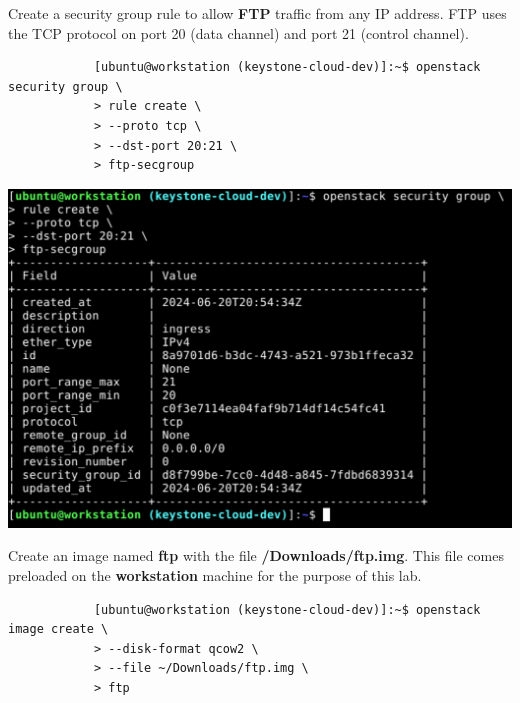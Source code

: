 \documentclass[letterpaper, 12pt]{article}
\begin{document}
\begin{enumerate}
    \begin{labstep}
        Create a security group rule to allow \textbf{FTP} traffic from any IP address.
        FTP uses the TCP protocol on port 20 (data channel) and port 21 (control channel).
        \begin{lstlisting}
            [ubuntu@workstation (keystone-cloud-dev)]:~$ openstack security group \
            > rule create \
            > --proto tcp \
            > --dst-port 20:21 \
            > ftp-secgroup
        \end{lstlisting}

        \begin{center}
            \includegraphics[width=\linewidth]{images/part1/step37.png}
        \end{center}
    \end{labstep}

    \begin{labstep}
        Create an image named \textbf{ftp} with the file \textbf{\texttildemid/Downloads/ftp.img}.
        This file comes preloaded on the \textbf{workstation} machine for the purpose of this lab.
        \begin{lstlisting}
            [ubuntu@workstation (keystone-cloud-dev)]:~$ openstack image create \
            > --disk-format qcow2 \
            > --file ~/Downloads/ftp.img \
            > ftp
        \end{lstlisting}


\end{labstep}
\end{enumerate}
\end{document}
